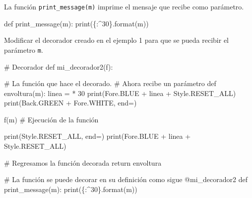 \documentclass[
  letterpaper,
  DIV=11,
  numbers=noendperiod]{scrreprt}
\newenvironment{Shaded}{\begin{snugshade}}{\end{snugshade}}
\newcommand{\AttributeTok}[1]{\textcolor[rgb]{0.40,0.45,0.13}{#1}}
\newcommand{\BuiltInTok}[1]{\textcolor[rgb]{0.00,0.23,0.31}{#1}}
\newcommand{\CommentTok}[1]{\textcolor[rgb]{0.37,0.37,0.37}{#1}}
\newcommand{\ControlFlowTok}[1]{\textcolor[rgb]{0.00,0.23,0.31}{#1}}
\newcommand{\DecValTok}[1]{\textcolor[rgb]{0.68,0.00,0.00}{#1}}
\newcommand{\KeywordTok}[1]{\textcolor[rgb]{0.00,0.23,0.31}{#1}}
\newcommand{\NormalTok}[1]{\textcolor[rgb]{0.00,0.23,0.31}{#1}}
\newcommand{\OperatorTok}[1]{\textcolor[rgb]{0.37,0.37,0.37}{#1}}
\newcommand{\SpecialCharTok}[1]{\textcolor[rgb]{0.37,0.37,0.37}{#1}}
\newcommand{\StringTok}[1]{\textcolor[rgb]{0.13,0.47,0.30}{#1}}
\begin{document}
La función \texttt{print\_message(m)} imprime el mensaje que recibe como
parámetro.

\begin{Shaded}
\begin{Highlighting}[]
\KeywordTok{def}\NormalTok{ print\_message(m):}
    \BuiltInTok{print}\NormalTok{(}\StringTok{\textquotesingle{}}\SpecialCharTok{\{:\^{}30\}}\StringTok{\textquotesingle{}}\NormalTok{.}\BuiltInTok{format}\NormalTok{(m))}
\end{Highlighting}
\end{Shaded}

Modificar el decorador creado en el ejemplo 1 para que se pueda recibir
el parámetro \texttt{m}.

\begin{Shaded}
\begin{Highlighting}[]
\CommentTok{\# Decorador}
\KeywordTok{def}\NormalTok{ mi\_decorador2(f):}

    \CommentTok{\# La función que hace el decorado.}
    \CommentTok{\# Ahora recibe un parámetro}
    \KeywordTok{def}\NormalTok{ envoltura(m):}
\NormalTok{        linea }\OperatorTok{=} \StringTok{\textquotesingle{}{-}\textquotesingle{}} \OperatorTok{*} \DecValTok{30}
        \BuiltInTok{print}\NormalTok{(Fore.BLUE }\OperatorTok{+}\NormalTok{ linea }\OperatorTok{+}\NormalTok{ Style.RESET\_ALL)}
        \BuiltInTok{print}\NormalTok{(Back.GREEN }\OperatorTok{+}\NormalTok{ Fore.WHITE, end}\OperatorTok{=}\StringTok{\textquotesingle{}\textquotesingle{}}\NormalTok{)}
        
\NormalTok{        f(m) }\CommentTok{\# Ejecución de la función}
        
        \BuiltInTok{print}\NormalTok{(Style.RESET\_ALL, end}\OperatorTok{=}\StringTok{\textquotesingle{}\textquotesingle{}}\NormalTok{)}
        \BuiltInTok{print}\NormalTok{(Fore.BLUE }\OperatorTok{+}\NormalTok{ linea }\OperatorTok{+}\NormalTok{ Style.RESET\_ALL)}

    \CommentTok{\# Regresamos la función decorada}
    \ControlFlowTok{return}\NormalTok{ envoltura }
\end{Highlighting}
\end{Shaded}

\begin{Shaded}
\begin{Highlighting}[]
\CommentTok{\# La función se puede decorar en su definición como sigue}
\AttributeTok{@mi\_decorador2}
\KeywordTok{def}\NormalTok{ print\_message(m):}
    \BuiltInTok{print}\NormalTok{(}\StringTok{\textquotesingle{}}\SpecialCharTok{\{:\^{}30\}}\StringTok{\textquotesingle{}}\NormalTok{.}\BuiltInTok{format}\NormalTok{(m))}
\end{Highlighting}
\end{Shaded}
\end{document}
